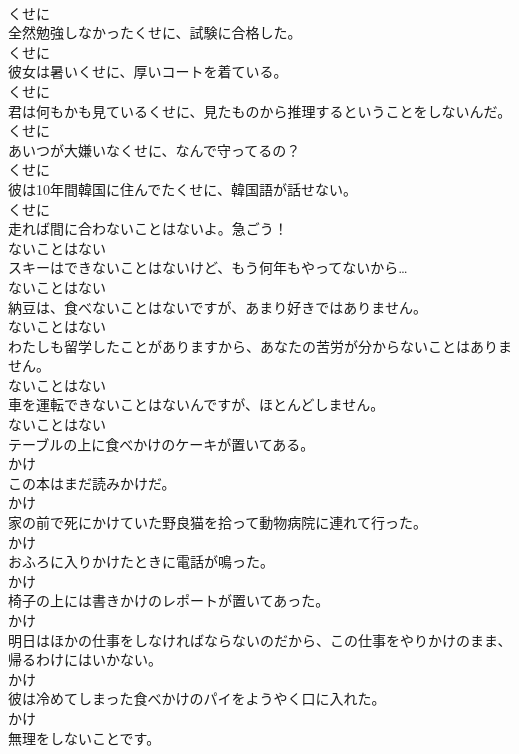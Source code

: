\documentclass[8pt]{extreport}
\begin{document}
\begin{CJK}{UTF8}{min}
\\	くせに
\\	全然勉強しなかったくせに、試験に合格した。	
\\	くせに
\\	彼女は暑いくせに、厚いコートを着ている。	
\\	くせに
\\	君は何もかも見ているくせに、見たものから推理するということをしないんだ。	
\\	くせに
\\	あいつが大嫌いなくせに、なんで守ってるの？	
\\	くせに
\\	彼は10年間韓国に住んでたくせに、韓国語が話せない。	
\\	くせに
\\	走れば間に合わないことはないよ。急ごう！	
\\	ないことはない
\\	スキーはできないことはないけど、もう何年もやってないから…	
\\	ないことはない
\\	納豆は、食べないことはないですが、あまり好きではありません。	
\\	ないことはない
\\	わたしも留学したことがありますから、あなたの苦労が分からないことはありません。	
\\	ないことはない
\\	車を運転できないことはないんですが、ほとんどしません。	
\\	ないことはない
\\	テーブルの上に食べかけのケーキが置いてある。	
\\	かけ
\\	この本はまだ読みかけだ。	
\\	かけ
\\	家の前で死にかけていた野良猫を拾って動物病院に連れて行った。	
\\	かけ
\\	おふろに入りかけたときに電話が鳴った。	
\\	かけ
\\	椅子の上には書きかけのレポートが置いてあった。	
\\	かけ
\\	明日はほかの仕事をしなければならないのだから、この仕事をやりかけのまま、帰るわけにはいかない。	
\\	かけ
\\	彼は冷めてしまった食べかけのパイをようやく口に入れた。	
\\	かけ
\\	無理をしないことです。	

\end{CJK}
\end{document}
